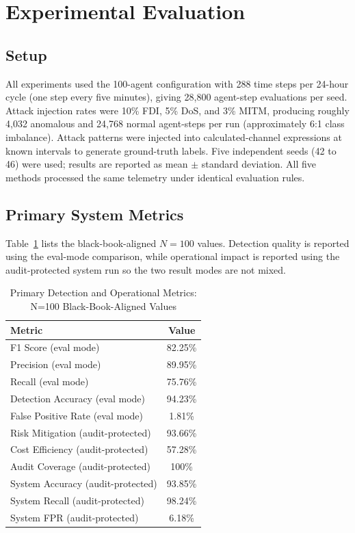 \documentclass[conference,a4paper]{IEEEtran}
\begin{document}
\section{Experimental Evaluation}

\subsection{Setup}

All experiments used the 100-agent configuration with 288 time steps per 24-hour cycle (one step every five minutes), giving 28,800 agent-step evaluations per seed. Attack injection rates were 10\% FDI, 5\% DoS, and 3\% MITM, producing roughly 4,032 anomalous and 24,768 normal agent-steps per run (approximately 6:1 class imbalance). Attack patterns were injected into calculated-channel expressions at known intervals to generate ground-truth labels. Five independent seeds (42 to 46) were used; results are reported as mean $\pm$ standard deviation. All five methods processed the same telemetry under identical evaluation rules.

\subsection{Primary System Metrics}

Table~\ref{tab:primary} lists the black-book-aligned $N=100$ values. Detection quality is reported using the eval-mode comparison, while operational impact is reported using the audit-protected system run so the two result modes are not mixed.

\begin{table}[htbp]
\caption{Primary Detection and Operational Metrics: N=100 Black-Book-Aligned Values}
\begin{center}
\begin{tabular}{|l|c|}
\hline
\textbf{Metric} & \textbf{Value} \\
\hline
F1 Score (eval mode) & 82.25\% \\
\hline
Precision (eval mode) & 89.95\% \\
\hline
Recall (eval mode) & 75.76\% \\
\hline
Detection Accuracy (eval mode) & 94.23\% \\
\hline
False Positive Rate (eval mode) & 1.81\% \\
\hline
Risk Mitigation (audit-protected) & 93.66\% \\
\hline
Cost Efficiency (audit-protected) & 57.28\% \\
\hline
Audit Coverage (audit-protected) & 100\% \\
\hline
System Accuracy (audit-protected) & 93.85\% \\
\hline
System Recall (audit-protected) & 98.24\% \\
\hline
System FPR (audit-protected) & 6.18\% \\
\hline
\end{tabular}
\label{tab:primary}
\end{center}
\end{table}
\end{document}
